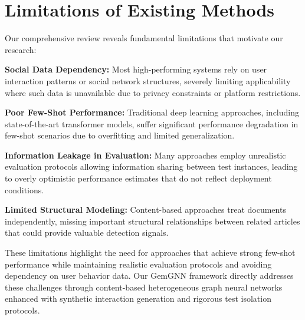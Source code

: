 \section{Limitations of Existing Methods}

Our comprehensive review reveals fundamental limitations that motivate our research:

\textbf{Social Data Dependency:} Most high-performing systems rely on user interaction patterns or social network structures, severely limiting applicability where such data is unavailable due to privacy constraints or platform restrictions.

\textbf{Poor Few-Shot Performance:} Traditional deep learning approaches, including state-of-the-art transformer models, suffer significant performance degradation in few-shot scenarios due to overfitting and limited generalization.

\textbf{Information Leakage in Evaluation:} Many approaches employ unrealistic evaluation protocols allowing information sharing between test instances, leading to overly optimistic performance estimates that do not reflect deployment conditions.

\textbf{Limited Structural Modeling:} Content-based approaches treat documents independently, missing important structural relationships between related articles that could provide valuable detection signals.

These limitations highlight the need for approaches that achieve strong few-shot performance while maintaining realistic evaluation protocols and avoiding dependency on user behavior data. Our GemGNN framework directly addresses these challenges through content-based heterogeneous graph neural networks enhanced with synthetic interaction generation and rigorous test isolation protocols.

